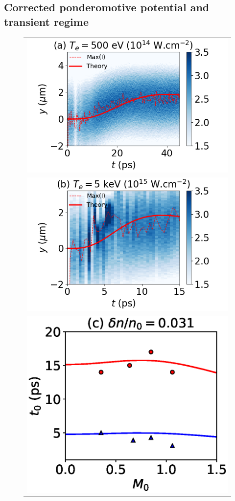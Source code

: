 \documentclass[%
 reprint,
 amsmath,amssymb,
 aps,
]{revtex4-1}
\begin{document}
\subsection{Corrected ponderomotive potential and transient regime} \label{sec:transient}
\begin{figure}
\begin{tabular}{c}
\includegraphics[scale=0.49]{fig3a.png} \\
\includegraphics[scale=0.49]{fig3b.png} \\
\includegraphics[scale=0.49]{th_PIC_t0.eps}

\end{tabular}
\end{figure}
\end{document}
